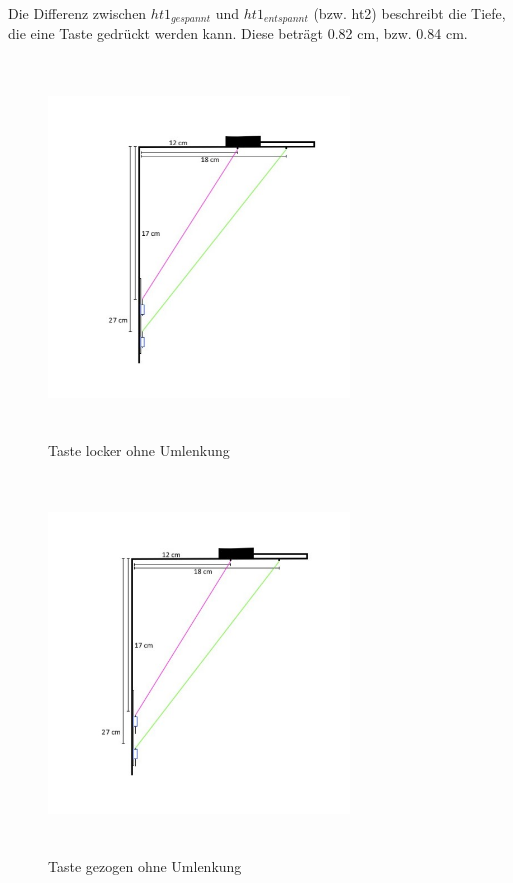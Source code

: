 Die Differenz zwischen $ht1_{gespannt}$ und $ht1_{entspannt}$ (bzw. ht2) beschreibt die Tiefe, die eine Taste gedrückt werden kann.
\newline Diese beträgt 0.82 cm, bzw. 0.84 cm.

\begin{figure}[htbp]
	\centering
	\includegraphics[width=8cm, height=10cm]{img/Umlenkung_locker}
	\caption{Taste locker ohne Umlenkung}
	\label{<label>}
\end{figure}

\begin{figure}[htbp]
	\centering
	\includegraphics[width=8cm, height=10cm]{img/Umlenkung_gezogen}
	\caption{Taste gezogen ohne Umlenkung}
	\label{<label>}
\end{figure}

